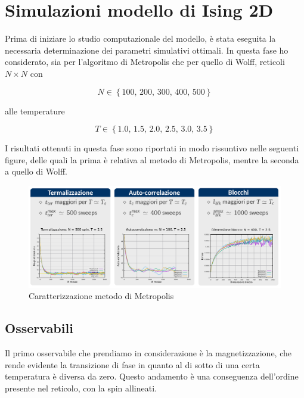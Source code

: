\section{Simulazioni modello di Ising 2D}

Prima di iniziare lo studio computazionale del modello, è stata eseguita la necessaria determinazione dei 
parametri simulativi ottimali. In questa fase ho considerato, sia per l'algoritmo di Metropolis che per quello 
di Wolff, reticoli $N \times N$ con 

$$
N \in \left\{100,\,200,\,300,\,400,\,500\right\}
$$

alle temperature

$$
T \in \left\{1.0,\,1.5,\,2.0,\,2.5,\,3.0,\,3.5\right\}
$$

I risultati ottenuti in questa fase sono riportati in modo rissuntivo nelle seguenti figure, delle quali la 
prima è relativa al metodo di Metropolis, mentre la seconda a quello di Wolff.

\begin{figure}[H]
    \centering
    \includegraphics[width=\textwidth]{Immagini/simIsing2D/carMetro.png}
    \caption{Caratterizzazione metodo di Metropolis}
    \label{fig: magn_Ising2D}
\end{figure}



\subsection{Osservabili}

Il primo osservabile che prendiamo in considerazione è la magnetizzazione, che rende evidente la transizione di fase in quanto al di 
sotto di una certa temperatura è diversa da zero. Questo andamento è una conseguenza dell'ordine presente nel reticolo, con la spin allineati. 

